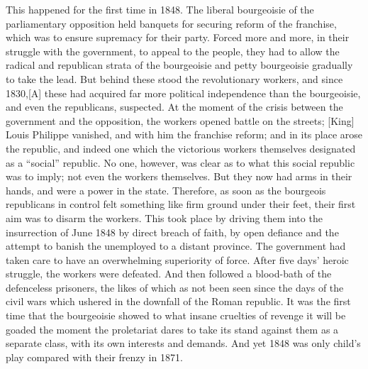 \documentclass{article}
\begin{document}
This happened for the first time in 1848. The liberal bourgeoisie of the
parliamentary opposition held banquets for securing reform of the
franchise, which was to ensure supremacy for their party. Forced more and
more, in their struggle with the government, to appeal to the people, they
had to allow the radical and republican strata of the bourgeoisie and
petty bourgeoisie gradually to take the lead. But behind these stood the
revolutionary workers, and since 1830,[A] these had acquired far more
political independence than the bourgeoisie, and even the republicans,
suspected. At the moment of the crisis between the government and the
opposition, the workers opened battle on the streets; [King] Louis
Philippe vanished, and with him the franchise reform; and in its place
arose the republic, and indeed one which the victorious workers themselves
designated as a “social” republic. No one, however, was clear as to what
this social republic was to imply; not even the workers themselves. But
they now had arms in their hands, and were a power in the state.
Therefore, as soon as the bourgeois republicans in control felt something
like firm ground under their feet, their first aim was to disarm the
workers. This took place by driving them into the insurrection of June
1848 by direct breach of faith, by open defiance and the attempt to banish
the unemployed to a distant province. The government had taken care to
have an overwhelming superiority of force. After five days’ heroic
struggle, the workers were defeated. And then followed a blood-bath of the
defenceless prisoners, the likes of which as not been seen since the days
of the civil wars which ushered in the downfall of the Roman republic. It
was the first time that the bourgeoisie showed to what insane cruelties of
revenge it will be goaded the moment the proletariat dares to take its
stand against them as a separate class, with its own interests and
demands. And yet 1848 was only child’s play compared with their frenzy in
1871.
\end{document}
